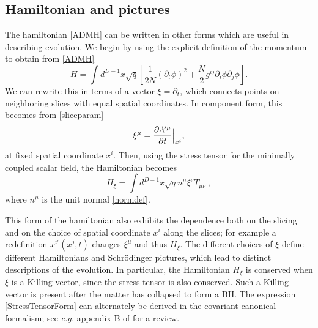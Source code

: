 \documentclass[12pt]{article}
\numberwithin{equation}{section}
\newcommand{\beq}{\begin{equation}}
\newcommand{\eeq}{\end{equation}}
\begin{document}
\subsection{Hamiltonian and pictures}\label{HandP}

The hamiltonian \eqref{ADMH} can be written in other forms which are useful in describing evolution. We begin by using  the explicit definition of the 
momentum to obtain from \eqref{ADMH}
\beq\label{LapseForm}
H= \int d^{D-1}x \sqrt{q} \left[\frac{1}{2N} (\partial_t\phi)^2+\frac{N}{2}g^{ij} \partial_i \phi \partial_j \phi \right].
\eeq 
We can rewrite this in terms of a vector $\xi=\partial_t$, which connects points on neighboring slices with equal spatial coordinates.
In component form, this becomes from \eqref{sliceparam}
\beq
\xi^{\mu} = \frac{\partial {\cal X}^{\mu}}{\partial t}\Big\vert_{x^i},
\eeq 
at fixed spatial coordinate $x^i$. Then, using the stress tensor for the minimally coupled scalar field, the  Hamiltonian becomes
\beq\label{StressTensorForm}
H_{\xi}= \int d^{D-1}x \sqrt{q} n^{\mu} \xi^{\nu} T_{\mu\nu}\ ,
\eeq
where $n^{\mu}$ is the unit normal \eqref{normdef}. 

This form of the hamiltonian also exhibits the dependence both on the slicing and on the choice of spatial coordinate $x^i$ along the slices; for example a redefinition $x^{i\prime}(x^j,t)$ changes $\xi^\mu$ and thus $H_\xi$.  The different choices of $\xi$ define different Hamiltonians and Schr\"odinger pictures,  which lead to distinct descriptions of the evolution.  In particular, the Hamiltonian $H_{\xi}$ is conserved when $\xi$ is a Killing vector, since the stress tensor is also conserved. Such a Killing vector is present after the  matter has collapsed to form a BH.  The expression \eqref{StressTensorForm} can alternately be derived in the covariant canonical formalism; see {\it e.g.} appendix B of \cite{DoGi2} for a review.
\end{document}
